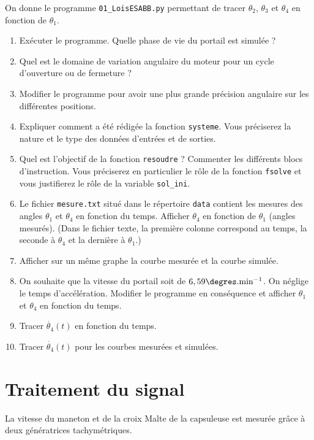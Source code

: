 \documentclass[10pt,fleqn]{article} %
\begin{document}
On donne le programme \texttt{01\_LoisESABB.py} permettant de tracer $\theta_2$, $\theta_3$ et $\theta_4$ en fonction de $\theta_1$.
\begin{enumerate}
\item Exécuter le programme. Quelle phase de vie du portail est simulée ?
\item Quel est le domaine de variation angulaire du moteur pour un cycle d'ouverture ou de fermeture ?
\item Modifier le programme pour avoir une plus grande précision angulaire sur les différentes positions.
\item Expliquer comment a été rédigée la fonction \texttt{systeme}. Vous préciserez la nature et le type des données d'entrées et de sorties. 
\item Quel est l'objectif de la fonction \texttt{resoudre} ? Commenter les différents blocs d'instruction. Vous préciserez en particulier le rôle de la fonction \texttt{fsolve} et vous justifierez le rôle de la variable \texttt{sol\_ini}.
\item Le fichier \texttt{mesure.txt} situé dans le répertoire \texttt{data} contient les mesures des angles $\theta_1$ et $\theta_4$ en fonction du temps. Afficher $\theta_4$ en fonction de $\theta_1$ (angles mesurés). (Dans le fichier texte, la première colonne correspond au temps, la seconde à $\theta_4$ et la dernière à $\theta_1$.)
\item Afficher sur un même graphe la courbe mesurée et la courbe simulée.  
\item On souhaite que la vitesse du portail soit de $6,59\degres.\text{min}^{-1}$. On néglige le temps d'accélération. Modifier le programme en conséquence et afficher $\theta_1$ et $\theta_4$ en fonction du temps.
\item Tracer $\dot{\theta_4}(t)$ en fonction du temps.
\item Tracer $\dot{\theta_4}(t)$ pour les courbes mesurées et simulées.
\end{enumerate}

\newpage

\section{Traitement du signal }%
La vitesse du maneton et de la croix Malte de la capsuleuse est mesurée grâce à deux génératrices tachymétriques.
\end{document}
